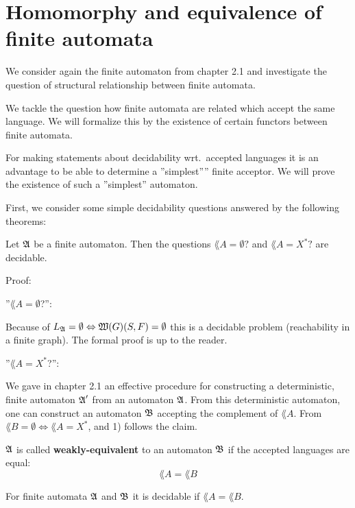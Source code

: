\section{Homomorphy and equivalence of finite automata}

We consider again the finite automaton from chapter 2.1 and investigate the
question of structural relationship between finite automata.

We tackle the question how finite automata are related which accept the same
language. We will formalize this by the existence of certain functors between
finite automata.

For making statements about decidability wrt.\ accepted languages it is an
advantage to be able to determine a ''simplest'''' finite acceptor. We will
prove the existence of such a ''simplest'' automaton.

First, we consider some simple decidability questions answered by the following
theorems:

\begin{theorem}
Let $\mbox{$\mathfrak{A}$}$ be a finite automaton. Then the questions $\lang{A} = \emptyset?$
and $\lang{A} = X^*?$ are decidable.
\end{theorem}

Proof:

''$\lang{A} = \emptyset$?'':

Because of $\mbox{$L_{\mathfrak{A}}$} = \emptyset \Leftrightarrow \mbox{$\mathfrak{W}(G)$}(S, F) =
\emptyset$ this is a decidable problem (reachability in a finite graph). The
formal proof is up to the reader.

''$\lang{A} = X^*$?'':

We gave in chapter 2.1 an effective procedure for constructing a deterministic,
finite automaton $\mbox{$\mathfrak{A}$}'$ from an automaton $\mbox{$\mathfrak{A}$}$. From this deterministic
automaton, one can construct an automaton $\mbox{$\mathfrak{B}$}$ accepting the complement of
$\lang{A}$. From $\lang{B} = \emptyset \Leftrightarrow \lang{A} = X^*$,
and 1) follows the claim.

\begin{definition}
$\mbox{$\mathfrak{A}$}$ is called {\bf weakly-equivalent} to an automaton $\mbox{$\mathfrak{B}$}$ if the
accepted languages are equal: \[ \lang{A} = \lang{B} \]
\end{definition}

\begin{theorem}
For finite automata $\mbox{$\mathfrak{A}$}$ and $\mbox{$\mathfrak{B}$}$ it is decidable if $\lang{A} =
\lang{B}$.
\end{theorem}

